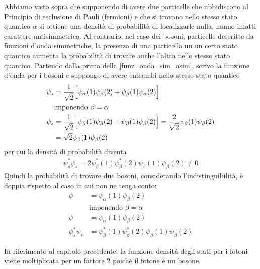 Abbiamo visto sopra che supponendo di avere due particelle che ubbidiscono al Principio di esclusione di Pauli (fermioni) e che si trovano nello stesso stato quantico $\alpha$ si ottiene una densità di probabilità di localizzarle nulla, hanno infatti carattere antisimmetrico.
Al contrario, nel caso dei bosoni, particelle descritte da funzioni d'onda simmetriche, la presenza di una particella un un certo stato quantico aumenta la probabilità di trovare anche l'altra nello stesso stato quantico.
Partendo dalla prima della \ref{funz_onda_sim_asim}, scrivo la funzione d'onda per i bosoni e suppongo di avere entrambi nello stesso stato quantico
\begin{equation}
\begin{split}
\psi_s & = \frac{1}{\sqrt{2}} \Bigl[ \psi_\alpha(1) \psi_\beta(2) + \psi_\beta(1) \psi_\alpha(2) \Bigr] \\
& \mbox{imponendo }  \beta = \alpha \\
\psi_s & = \frac{1}{\sqrt{2}} \Bigl[ \psi_\beta(1) \psi_\beta(2) + \psi_\beta(1) \psi_\beta(2) \Bigr] 
= \frac{ 2}{\sqrt{2} } \psi_\beta(1) \psi_\beta(2) \\
& = \sqrt{2} \psi_\beta(1) \psi_\beta(2)
\end{split}
\end{equation}
per cui la densità di probabilità diventa
\begin{equation}
\begin{split}
\psi^{\ast}_s \psi_s = 2 \psi^{\ast}_\beta(1)\psi^{\ast}_\beta(2)\psi_\beta(1)\psi_\beta(2) \not = 0
\end{split}
\end{equation}
Quindi la probabilità di trovare due bosoni, considerando l'indistinguibilità, è doppia rispetto al caso in cui non ne tenga conto:
\begin{equation}
\begin{split}
\psi & = \psi_\alpha(1) \psi_\beta(2) \\
& \mbox{imponendo }  \beta = \alpha \\
\psi & = \psi_\alpha(1) \psi_\beta(2) \\
\psi^{\ast}_s \psi_s & = \psi^{\ast}_\beta(1)\psi^{\ast}_\beta(2)\psi_\beta(1)\psi_\beta(2)
\end{split}
\end{equation}

In riferimento al capitolo precedente:
la funzione densità degli stati per i fotoni viene moltiplicata per un fattore $2$ poiché il fotone è un bosone.




